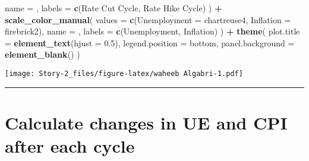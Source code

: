 \documentclass[
]{article}
\newenvironment{Shaded}{\begin{snugshade}}{\end{snugshade}}
\newcommand{\AttributeTok}[1]{\textcolor[rgb]{0.13,0.29,0.53}{#1}}
\newcommand{\FloatTok}[1]{\textcolor[rgb]{0.00,0.00,0.81}{#1}}
\newcommand{\FunctionTok}[1]{\textcolor[rgb]{0.13,0.29,0.53}{\textbf{#1}}}
\newcommand{\NormalTok}[1]{#1}
\newcommand{\OtherTok}[1]{\textcolor[rgb]{0.56,0.35,0.01}{#1}}
\newcommand{\SpecialCharTok}[1]{\textcolor[rgb]{0.81,0.36,0.00}{\textbf{#1}}}
\newcommand{\StringTok}[1]{\textcolor[rgb]{0.31,0.60,0.02}{#1}}
\begin{document}
\begin{Shaded}
\begin{Highlighting}[]
    \AttributeTok{name =} \StringTok{\textquotesingle{}\textquotesingle{}}\NormalTok{, }
    \AttributeTok{labels =} \FunctionTok{c}\NormalTok{(}\StringTok{\textquotesingle{}Rate Cut Cycle\textquotesingle{}}\NormalTok{, }\StringTok{\textquotesingle{}Rate Hike Cycle\textquotesingle{}}\NormalTok{)}
\NormalTok{  ) }\SpecialCharTok{+}
  \FunctionTok{scale\_color\_manual}\NormalTok{(}
    \AttributeTok{values =} \FunctionTok{c}\NormalTok{(}\StringTok{\textquotesingle{}Unemployment\textquotesingle{}} \OtherTok{=} \StringTok{\textquotesingle{}chartreuse4\textquotesingle{}}\NormalTok{, }\StringTok{\textquotesingle{}Inflation\textquotesingle{}} \OtherTok{=} \StringTok{\textquotesingle{}firebrick2\textquotesingle{}}\NormalTok{),}
    \AttributeTok{name =} \StringTok{\textquotesingle{}\textquotesingle{}}\NormalTok{,}
    \AttributeTok{labels =} \FunctionTok{c}\NormalTok{(}\StringTok{\textquotesingle{}Unemployment\textquotesingle{}}\NormalTok{, }\StringTok{\textquotesingle{}Inflation\textquotesingle{}}\NormalTok{)}
\NormalTok{  ) }\SpecialCharTok{+}
  \FunctionTok{theme}\NormalTok{(}
    \AttributeTok{plot.title =} \FunctionTok{element\_text}\NormalTok{(}\AttributeTok{hjust =} \FloatTok{0.5}\NormalTok{),}
    \AttributeTok{legend.position =} \StringTok{\textquotesingle{}bottom\textquotesingle{}}\NormalTok{,}
    \AttributeTok{panel.background =} \FunctionTok{element\_blank}\NormalTok{()}
\NormalTok{  )}
\end{Highlighting}
\end{Shaded}

\texttt{[image: Story-2\_files/figure-latex/waheeb Algabri-1.pdf]}

\begin{center}\rule{0.5\linewidth}{0.5pt}\end{center}

\section{Calculate changes in UE and CPI after each
cycle}\label{calculate-changes-in-ue-and-cpi-after-each-cycle}
\end{document}
